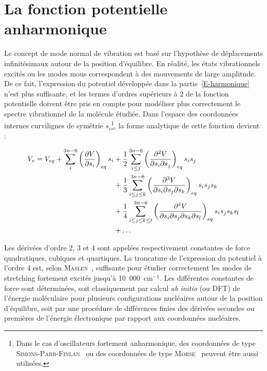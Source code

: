 \section{La fonction potentielle anharmonique}

Le concept de mode normal de vibration est basé sur l'hypothèse de déplacements infinitésimaux autour de la position d'équilibre. En réalité, les états vibrationnels excités ou les modes mous correspondent à des mouvements de large amplitude. De ce fait, l'expression du potentiel développée dans la partie~\ref{E-harmonique} n'est plus suffisante, et les termes d'ordres supérieurs à 2 de la fonction potentielle doivent être pris en compte pour modéliser plus correctement le spectre vibrationnel de la molécule étudiée. Dans l'espace des coordonnées internes curvilignes de symétrie $s_i$\footnote{Dans le cas d'oscillateurs fortement anharmonique, des coordonnées de type \textsc{Simons-Parr-Finlan}~\cite{II-d-15} ou des coordonnées de type \textsc{Morse}~\cite{II-d-16} peuvent être aussi utilisées.}, la forme analytique de cette fonction devient :

\begin{align} \label{V-Taylor-si}
	V_v = V_{eq} + \sum^{3n-6}_i\left(\frac{\partial V}{\partial s_i}\right)_{eq} s_i &+ \frac{1}{2} \sum^{3n-6}_{i\leq j} \left(\frac{\partial^2 V}{\partial s_i \partial s_j}\right)_{eq} s_i s_j \\ \notag
	&+ \frac{1}{3} \sum^{3n-6}_{i\leq j\leq k} \left(\frac{\partial^3 V}{\partial s_i \partial s_j \partial s_k}\right)_{eq} s_i s_j s_k \\ \notag
	&+ \frac{1}{4} \sum^{3n-6}_{i\leq j\leq k\leq l} \left(\frac{\partial^4 V}{\partial s_i \partial s_j \partial s_k \partial s_l}\right)_{eq} s_i s_j s_k s_l \\ \notag
	&+ \ldots
\end{align}

Les dérivées d'ordre 2, 3 et 4 sont appelées respectivement constantes de force quadratiques, cubiques et quartiques. 
La troncature de l'expression du potentiel à l'ordre 4 est, selon \textsc{Maslen}~\cite{II-7}, suffisante pour étudier correctement les modes de stretching fortement excités jusqu'à 10~000~cm$^{-1}$.
Les différentes constantes de force sont déterminées, soit classiquement par calcul \textit{ab initio} (ou DFT) de l'énergie moléculaire pour plusieurs configurations nucléaires autour de la position d'équilibre, soit par une procédure de différences finies des dérivées secondes ou premières de l'énergie électronique par rapport aux coordonnées nucléaires.

